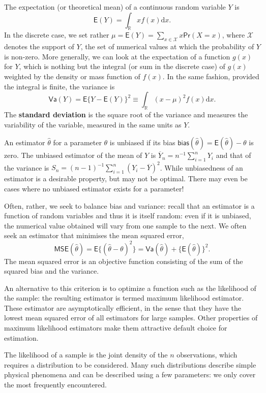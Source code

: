 \documentclass[
  11pt,
  letterpaper,
]{book}
\theoremstyle{definition}
\theoremstyle{definition}
\theoremstyle{definition}
\theoremstyle{remark}
\begin{document}
The expectation (or theoretical mean) of a continuous random variable \(Y\) is \[\mathsf{E}(Y)=\int_{\mathbb{R}} x f(x) \mathrm{d} x.\]
In the discrete case, we set rather \(\mu = \mathsf{E}(Y)=\sum_{x \in \mathcal{X}} x \mathsf{Pr}(X=x)\), where \(\mathcal{X}\) denotes the support of \(Y\), the set of numerical values at which the probability of \(Y\) is non-zero.
More generally, we can look at the expectation of a function \(g(x)\) for \(Y\), which is nothing but the integral (or sum in the discrete case) of \(g(x)\) weighted by the density or mass function of \(f(x)\). In the same fashion, provided the integral is finite, the variance is
\[\mathsf{Va}(Y)=\mathsf{E}\{Y-\mathsf{E}(Y)\}^2 \equiv \int_{\mathbb{R}} (x-\mu)^2 f(x) \mathrm{d} x.\]
The \textbf{standard deviation} is the square root of the variance and measures the variability of the variable, measured in the same units as \(Y\).

An estimator \(\hat{\theta}\) for a parameter \(\theta\) is unbiased if its bias \(\mathsf{bias}(\hat{\theta})=\mathsf{E}(\hat{\theta})- \theta\) is zero.
The unbiased estimator of the mean of \(Y\) is \(\overline{Y}_n = n^{-1} \sum_{i=1}^n Y_i\) and that of the variance is \(S_n = (n-1)^{-1} \sum_{i=1}^n (Y_i-\overline{Y})^2\). While unbiasedness of an estimator is a desirable property, but may not be optimal. There may even be cases where no unbiased estimator exists for a parameter!

Often, rather, we seek to balance bias and variance: recall that an estimator is a function of random variables and thus it is itself random: even if it is unbiased, the numerical value obtained will vary from one sample to the next. We often seek an estimator that minimises the mean squared error, \[\mathsf{MSE}(\hat{\theta}) = \mathsf{E}\{(\hat{\theta}-\theta)^2\}=\mathsf{Va}(\hat{\theta}) + \{\mathsf{E}(\hat{\theta})\}^2.\]
The mean squared error is an objective function consisting of the sum of the squared bias and the variance.

An alternative to this criterion is to optimize a function such as the likelihood of the sample: the resulting estimator is termed maximum likelihood estimator. These estimator are asymptotically efficient, in the sense that they have the lowest mean squared error of all estimators for large samples. Other properties of maximum likelihood estimators make them attractive default choice for estimation.

The likelihood of a sample is the joint density of the \(n\) observations, which requires a distribution to be considered. Many such distributions describe simple physical phenomena and can be described using a few parameters: we only cover the most frequently encountered.
\end{document}
